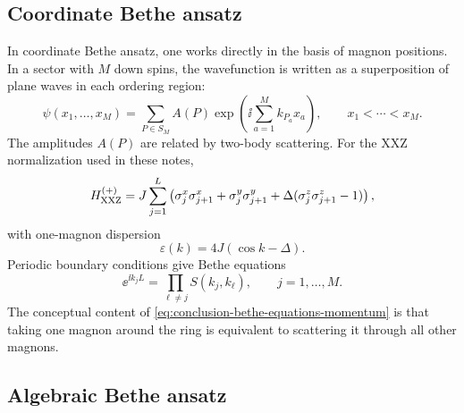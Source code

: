 \subsection{Coordinate Bethe ansatz}

In coordinate Bethe ansatz, one works directly in the basis of magnon positions.  In a sector with \(M\) down spins, the wavefunction is written as a superposition of plane waves in each ordering region:
\begin{equation}
\label{eq:conclusion-cba-wavefunction}
    \psi(x_1,\ldots,x_M)
    =
    \sum_{P\in S_M}
    A(P)
    \exp\left(\ii\sum_{a=1}^M k_{P_a}x_a\right),
    \qquad
    x_1<\cdots<x_M .
\end{equation}
The amplitudes \(A(P)\) are related by two-body scattering.  For the XXZ normalization used in these notes,
\begin{equation}
\label{eq:conclusion-xxz-hamiltonian}
    H_{\rm XXZ}^{(+)}
    =
    J\sum_{j=1}^L
    \left(
        \sigma_j^x\sigma_{j+1}^x
        +\sigma_j^y\sigma_{j+1}^y
        +\Delta(\sigma_j^z\sigma_{j+1}^z-1)
    \right),
\end{equation}
with one-magnon dispersion
\begin{equation}
\label{eq:conclusion-one-magnon-dispersion}
    \varepsilon(k)=4J(\cos k-\Delta).
\end{equation}
Periodic boundary conditions give Bethe equations
\begin{equation}
\label{eq:conclusion-bethe-equations-momentum}
    \ee^{\ii k_jL}
    =
    \prod_{\ell\neq j}S(k_j,k_\ell),
    \qquad j=1,\ldots,M.
\end{equation}
The conceptual content of \cref{eq:conclusion-bethe-equations-momentum} is that taking one magnon around the ring is equivalent to scattering it through all other magnons.

\subsection{Algebraic Bethe ansatz}

